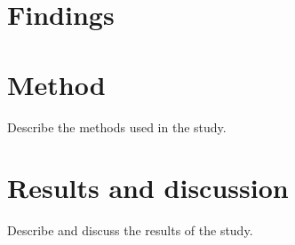 \documentclass{article}
\begin{document}
\begin{table}[H]
	
\end{table}



\section{Findings}

\section{Method}
Describe the methods used in the study.

\section{Results and discussion}
Describe and discuss the results of the study.


\theendnotes



\end{document}
